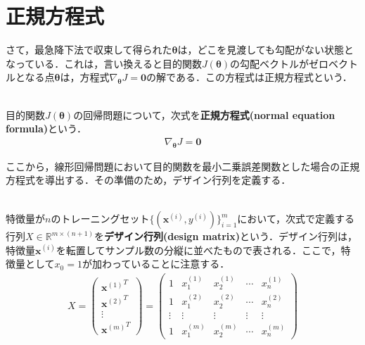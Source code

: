 \section{正規方程式}

さて，最急降下法で収束して得られた${\bm \theta}$は，どこを見渡しても勾配がない状態となっている．これは，言い換えると目的関数$J({\bm \theta})$の勾配ベクトルがゼロベクトルとなる点${\bm \theta}$は，方程式$\nabla_{{\bm \theta}}J={\bm 0}$の解である．この方程式は正規方程式という．
\begin{defi}[正規方程式]
　\\
目的関数$J({\bm \theta})$の回帰問題について，次式を{\bf 正規方程式(normal equation formula)}という．
\begin{align}
\nabla_{{\bm \theta}}J={\bm 0}
\end{align}
\end{defi}

ここから，線形回帰問題において目的関数を最小二乗誤差関数とした場合の正規方程式を導出する．その準備のため，デザイン行列を定義する．

\begin{defi}[デザイン行列]
　\\
特徴量が$n$のトレーニングセット$\{({\bm x}^{(i)},y^{(i)})\}_{i=1}^m$において，次式で定義する行列$X \in \mathbb{R}^{m\times (n+1)}$を{\bf デザイン行列(design matrix)}という．デザイン行列は，特徴量${\bm x}^{(i)}$を転置してサンプル数の分縦に並べたもので表される．ここで，特徴量として$x_0=1$が加わっていることに注意する．
\begin{align}
X = 
\left(
\begin{array}{c}
{{\bm x}^{(1)}}^T \\
{{\bm x}^{(2)}}^T \\
\vdots \\
{{\bm x}^{(m)}}^T
\end{array}
\right)
=
\left(
\begin{array}{ccccc}
1 & x_1^{(1)} & x_2^{(1)} & \cdots & x_n^{(1)} \\
1 & x_1^{(2)} & x_2^{(2)} & \cdots & x_n^{(2)} \\
\vdots & \vdots & \vdots & \vdots & \vdots \\
1 & x_1^{(m)} & x_2^{(m)} & \cdots & x_n^{(m)} 
\end{array}
\right)
\end{align}
\end{defi}

